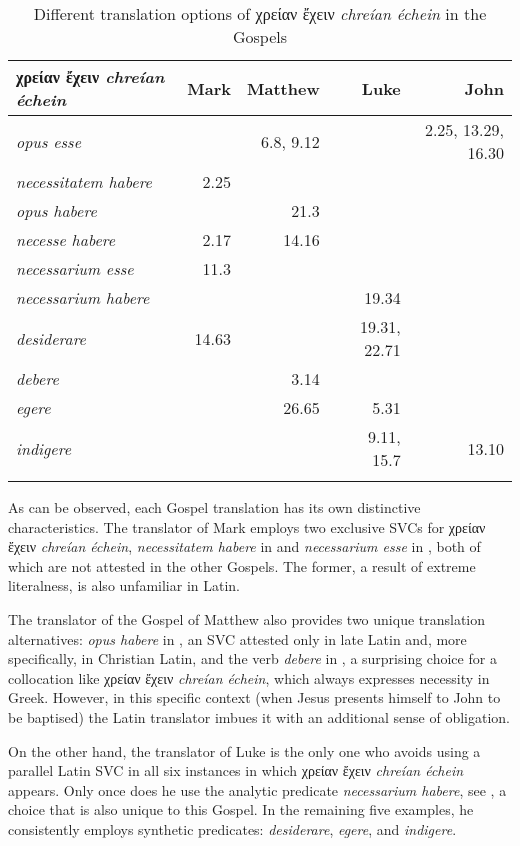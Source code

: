 \documentclass[output=paper,colorlinks,citecolor=brown]{langscibook}
\begin{document}
\begin{table}
\caption{Different translation options of χρείαν ἔχειν \emph{chreían échein} in
  the Gospels}
\label{tbl:bj:6}
\centering
\small
\begin{tabularx}{\textwidth}{Xrrrr}
\lsptoprule
χρείαν ἔχειν \emph{chreían échein} & Mark & Matthew & Luke & John\\
\midrule
\emph{opus esse} &  & 6.8, 9.12 &  & 2.25, 13.29, 16.30\\
\emph{necessitatem habere} & 2.25 &  &  & \\
\emph{opus habere} &  & 21.3 &  & \\
\emph{necesse habere} & 2.17 & 14.16 &  & \\
\emph{necessarium esse} & 11.3 &  &  & \\
\emph{necessarium habere} &  &  & 19.34 & \\
\emph{desiderare} & 14.63 &  & 19.31, 22.71 & \\
\emph{debere} &  & 3.14 &  & \\
\emph{egere} &  & 26.65 & 5.31 & \\
\emph{indigere} &  &  & 9.11, 15.7 & 13.10\\
\lspbottomrule
\end{tabularx}
\end{table}

As can be observed, each Gospel translation has its own distinctive characteristics. The
translator of Mark employs two exclusive SVCs for χρείαν ἔχειν \emph{chreían échein},
\emph{necessitatem habere} in  and \emph{necessarium esse} in ,
both of which are not attested in the other Gospels. The former, a result of extreme
literalness, is also unfamiliar in Latin.




The translator of the Gospel of Matthew also provides two unique translation alternatives:
\emph{opus habere} in , an SVC attested only in late Latin and, more
specifically, in Christian Latin, and the verb \emph{debere} in , a
surprising choice for a collocation like χρείαν ἔχειν \emph{chreían échein}, which
always expresses necessity in Greek. However, in this specific context (when Jesus
presents himself to John to be baptised) the Latin translator imbues it with an additional
sense of obligation.

On the other hand, the translator of Luke is the only one who avoids using a parallel
Latin SVC in all six instances in which χρείαν ἔχειν \emph{chreían échein} appears. Only
once does he use the analytic predicate \emph{necessarium habere}, see , a choice that is
also unique to this Gospel. In the remaining five examples, he consistently employs
synthetic predicates: \emph{desiderare}, \emph{egere}, and \emph{indigere}.
\end{document}
